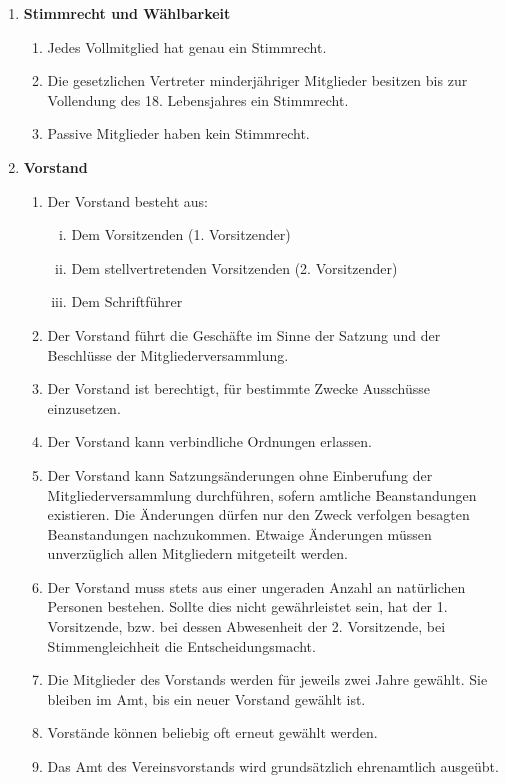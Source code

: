 \documentclass[a4paper,11pt]{article}
\begin{document}
\begin{enumerate}[§ 1.]
\item \textsf{\textbf{Stimmrecht und Wählbarkeit}}

\begin{enumerate}[1.]
\item Jedes Vollmitglied hat genau ein Stimmrecht.
\item Die gesetzlichen Vertreter minderjähriger Mitglieder besitzen bis zur Vollendung des 18.
Lebensjahres ein Stimmrecht.
\item Passive Mitglieder haben kein Stimmrecht.
\end{enumerate}

\item \textsf{\textbf{Vorstand}}

\begin{enumerate}[1.]
\item Der Vorstand besteht aus:
\begin{enumerate}[i)]
\item Dem Vorsitzenden (1. Vorsitzender)
\item Dem stellvertretenden Vorsitzenden (2. Vorsitzender)
\item Dem Schriftführer
\end{enumerate}
\item Der Vorstand führt die Geschäfte im Sinne der Satzung und der Beschlüsse der Mitgliederversammlung.
\item Der Vorstand ist berechtigt, für bestimmte Zwecke Ausschüsse einzusetzen.
\item Der Vorstand kann verbindliche Ordnungen erlassen.
\item Der Vorstand kann Satzungsänderungen ohne Einberufung der Mitgliederversammlung
durchführen, sofern amtliche Beanstandungen existieren. Die Änderungen dürfen nur den Zweck verfolgen besagten Beanstandungen nachzukommen. Etwaige Änderungen müssen unverzüglich allen Mitgliedern mitgeteilt werden.
\item Der Vorstand muss stets aus einer ungeraden Anzahl an natürlichen Personen bestehen. Sollte dies nicht gewährleistet sein, hat der 1. Vorsitzende, bzw. bei dessen Abwesenheit der 2. Vorsitzende, bei Stimmengleichheit die Entscheidungsmacht.
\item Die Mitglieder des Vorstands werden für jeweils zwei Jahre gewählt. Sie bleiben im Amt, bis ein neuer Vorstand gewählt ist.
\item Vorstände können beliebig oft erneut gewählt werden.
\item Das Amt des Vereinsvorstands wird grundsätzlich ehrenamtlich ausgeübt.

\end{enumerate}
\end{enumerate}
\end{document}
